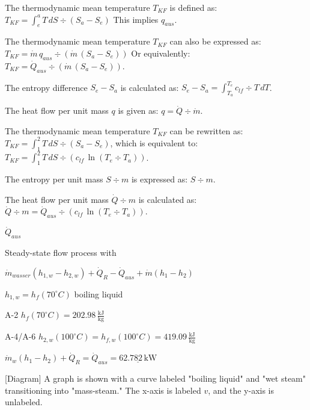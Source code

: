 The thermodynamic mean temperature \( T_{KF} \) is defined as:  
\( T_{KF} = \int_{e}^{a} T \, dS \div (S_a - S_e) \)  
This implies \( q_{aus} \).  

The thermodynamic mean temperature \( T_{KF} \) can also be expressed as:  
\( T_{KF} = \dot{m} \, q_{aus} \div (\dot{m} \, (S_a - S_e)) \)  
Or equivalently:  
\( T_{KF} = \dot{Q}_{aus} \div (\dot{m} \, (S_a - S_e)) \).  

The entropy difference \( S_e - S_a \) is calculated as:  
\( S_e - S_a = \int_{T_a}^{T_e} c_{lf} \div T \, dT \).  

The heat flow per unit mass \( q \) is given as:  
\( q = \dot{Q} \div \dot{m} \).  

The thermodynamic mean temperature \( T_{KF} \) can be rewritten as:  
\( T_{KF} = \int_{1}^{2} T \, dS \div (S_a - S_e) \),  
which is equivalent to:  
\( T_{KF} = \int_{1}^{2} T \, dS \div (c_{lf} \, \ln(T_e \div T_a)) \).  

The entropy per unit mass \( S \div m \) is expressed as:  
\( S \div m \).  

The heat flow per unit mass \( \dot{Q} \div m \) is calculated as:  
\( \dot{Q} \div m = \dot{Q}_{aus} \div (c_{lf} \, \ln(T_e \div T_a)) \).

\( \dot{Q}_{aus} \)  

Steady-state flow process with  

\( \dot{m}_{wasser} (h_{1,w} - h_{2,w}) + \dot{Q}_R - \dot{Q}_{aus} + \dot{m} (h_1 - h_2) \)  

\( h_{1,w} = h_f(70^\circ C) \) boiling liquid  

A-2  
\( h_f(70^\circ C) = 202.98 \, \frac{\text{kJ}}{\text{kg}} \)  

A-4/A-6  
\( h_{2,w}(100^\circ C) = h_{f,w}(100^\circ C) = 419.09 \, \frac{\text{kJ}}{\text{kg}} \)  

\( \dot{m}_w (h_1 - h_2) + \dot{Q}_R = \dot{Q}_{aus} = \underline{62.782 \, \text{kW}} \)  

[Diagram]  
A graph is shown with a curve labeled "boiling liquid" and "wet steam" transitioning into "mass-steam." The x-axis is labeled \( v \), and the y-axis is unlabeled.